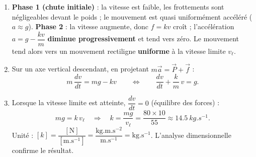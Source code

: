 \documentclass[11pt]{article}
\begin{document}
\begin{corrige}
\begin{enumerate}
\item \textbf{Phase 1 (chute initiale)} : la vitesse est faible, les frottements sont négligeables devant le poids ; le mouvement est quasi uniformément accéléré ($a \approx g$). \textbf{Phase 2} : la vitesse augmente, donc $f = kv$ croît ; l'accélération $a = g - \dfrac{kv}{m}$ \textbf{diminue progressivement} et tend vers zéro. Le mouvement tend alors vers un mouvement rectiligne \textbf{uniforme} à la vitesse limite $v_\ell$.
\item Sur un axe vertical descendant, en projetant $m\vec{a} = \vec{P} + \vec{f}$ :
\[ m\,\frac{dv}{dt} = mg - kv \qquad\Longleftrightarrow\qquad \frac{dv}{dt} + \frac{k}{m}\,v = g. \]
\item Lorsque la vitesse limite est atteinte, $\dfrac{dv}{dt} = 0$ (équilibre des forces) :
\[ mg = k\,v_\ell \quad\Longrightarrow\quad k = \frac{mg}{v_\ell} = \frac{80\times 10}{55} \approx \SI{14,5}{kg.s^{-1}}. \]
Unité : $[k] = \dfrac{[\mathrm{N}]}{[\mathrm{m.s^{-1}}]} = \dfrac{\mathrm{kg.m.s^{-2}}}{\mathrm{m.s^{-1}}} = \mathrm{kg.s^{-1}}$. L'analyse dimensionnelle confirme le résultat.
\end{enumerate}
\end{corrige}
\end{document}
